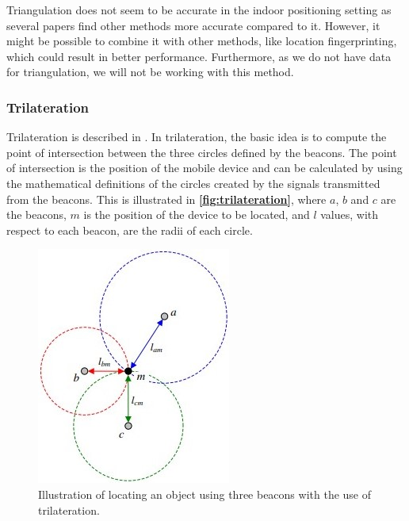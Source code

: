 Triangulation does not seem to be accurate in the indoor positioning setting as several papers find other methods more accurate compared to it\cite{triangulation02}\cite{triangulation03trilat}. However, it might be possible to combine it with other methods, like location fingerprinting, which could result in better performance\cite{triangulation4}. Furthermore, as we do not have data for triangulation, we will not be working with this method.

\subsubsection{Trilateration} \label{sec:trilateration} 
Trilateration is described in \cite{Triangulation}. In trilateration, the basic idea is to compute the point of intersection between the three circles defined by the beacons. The point of intersection is the position of the mobile device and can be calculated by using the mathematical definitions of the circles created by the signals transmitted from the beacons. This is illustrated in \textbf{\autoref{fig:trilateration}}, where $a$, $b$ and $c$ are the beacons, $m$ is the position of the device to be located, and $l$ values, with respect to each beacon, are the radii of each circle.

\begin{figure}[H]
    \centering
    \includegraphics[scale=0.8]{Images/ProblemAnalysis/trilateration.jpg}
    \caption{Illustration of locating an object using three beacons with the use of trilateration\cite{Triangulation}.}
    \label{fig:trilateration}
\end{figure}

